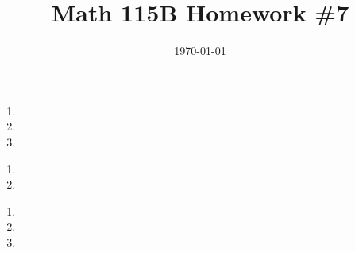 \documentclass{article}
\date{\today}
\title{Math 115B Homework \#7}
\begin{document}
\maketitle

\begin{prob}
\end{prob}

\bigskip
\par
\begin{prob}
\end{prob}
\begin{enumerate}[label=(\alph*)]
    \item
    \item
    \item
\end{enumerate}


\bigskip
\par
\begin{prob}
\end{prob}

\bigskip
\par
\begin{prob}
\end{prob}
\begin{enumerate}[label=(\alph*)]
    \item
    \item
\end{enumerate}


\bigskip
\par
\begin{prob}
\end{prob}
\begin{enumerate}[label=(\alph*)]
    \item
    \item
    \item
\end{enumerate}

\bigskip
\par
\begin{prob}
\end{prob}

\bigskip
\par
\begin{prob}
\end{prob}

\bigskip
\par
\begin{prob}
\end{prob}

\bigskip
\par
\begin{prob}
\end{prob}


\end{document}
